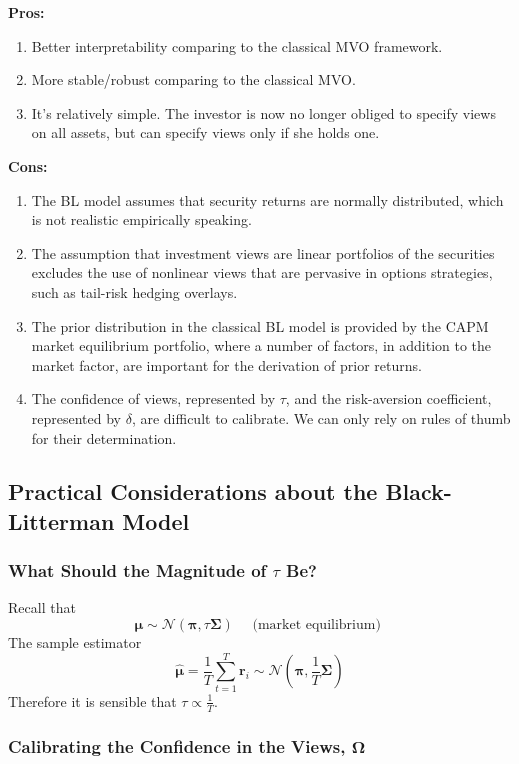\documentclass[13pt]{article}
\theoremstyle{definition}
\theoremstyle{remark}
\begin{document}
\textbf{Pros:}
\begin{enumerate}
\item Better interpretability comparing to the classical MVO framework.
\item More stable/robust comparing to the classical MVO.
\item It's relatively simple. The investor is now no longer obliged to specify views on all assets, but can specify views only if she holds one.
\end{enumerate}
\textbf{Cons:}
\begin{enumerate}
\item The BL model assumes that security returns are normally distributed, which is not realistic empirically speaking.
\item The assumption that investment views are linear portfolios of the securities excludes the use of nonlinear views that are pervasive in options strategies, such as tail-risk hedging overlays.
\item The prior distribution in the classical BL model is provided by the CAPM market equilibrium portfolio, where a number of factors, in addition to the market factor, are important for the derivation of prior returns.
\item The confidence of views, represented by $\tau$, and the risk-aversion coefficient, represented by $\delta$, are difficult to calibrate. We can only rely on rules of thumb for their determination.
\end{enumerate}

\subsection{Practical Considerations about the Black-Litterman Model}

\subsubsection{What Should the Magnitude of ${\tau}$ Be?}

Recall that
$$
\bm{\mu} \sim \mathcal{N}(\bm{\pi}, \tau \mathbf{\Sigma}) \quad \text { (market equilibrium) }
$$
The sample estimator
$$
\bm{\hat{\bm{\mu}}}=\frac{1}{T} \sum_{t=1}^{T} \bm{\bm{r}}_{i} \sim \mathcal{N}\left(\bm{\pi}, \frac{1}{T} \mathbf{\Sigma}\right)
$$
Therefore it is sensible that $\tau \propto \frac{1}{T}$.

\subsubsection{Calibrating the Confidence in the Views, $\mathbf{\Omega}$}
\end{document}
